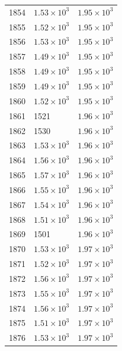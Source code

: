 \begin{table}[H]
\begin{tabular}{lll}
1854 & $\displaystyle 1.53 \times 10^{3}$ & $\displaystyle 1.95 \times 10^{3}$ \\
1855 & $\displaystyle 1.52 \times 10^{3}$ & $\displaystyle 1.95 \times 10^{3}$ \\
1856 & $\displaystyle 1.53 \times 10^{3}$ & $\displaystyle 1.95 \times 10^{3}$ \\
1857 & $\displaystyle 1.49 \times 10^{3}$ & $\displaystyle 1.95 \times 10^{3}$ \\
1858 & $\displaystyle 1.49 \times 10^{3}$ & $\displaystyle 1.95 \times 10^{3}$ \\
1859 & $\displaystyle 1.49 \times 10^{3}$ & $\displaystyle 1.95 \times 10^{3}$ \\
1860 & $\displaystyle 1.52 \times 10^{3}$ & $\displaystyle 1.95 \times 10^{3}$ \\
1861 & 1521 & $\displaystyle 1.96 \times 10^{3}$ \\
1862 & 1530 & $\displaystyle 1.96 \times 10^{3}$ \\
1863 & $\displaystyle 1.53 \times 10^{3}$ & $\displaystyle 1.96 \times 10^{3}$ \\
1864 & $\displaystyle 1.56 \times 10^{3}$ & $\displaystyle 1.96 \times 10^{3}$ \\
1865 & $\displaystyle 1.57 \times 10^{3}$ & $\displaystyle 1.96 \times 10^{3}$ \\
1866 & $\displaystyle 1.55 \times 10^{3}$ & $\displaystyle 1.96 \times 10^{3}$ \\
1867 & $\displaystyle 1.54 \times 10^{3}$ & $\displaystyle 1.96 \times 10^{3}$ \\
1868 & $\displaystyle 1.51 \times 10^{3}$ & $\displaystyle 1.96 \times 10^{3}$ \\
1869 & 1501 & $\displaystyle 1.96 \times 10^{3}$ \\
1870 & $\displaystyle 1.53 \times 10^{3}$ & $\displaystyle 1.97 \times 10^{3}$ \\
1871 & $\displaystyle 1.52 \times 10^{3}$ & $\displaystyle 1.97 \times 10^{3}$ \\
1872 & $\displaystyle 1.56 \times 10^{3}$ & $\displaystyle 1.97 \times 10^{3}$ \\
1873 & $\displaystyle 1.55 \times 10^{3}$ & $\displaystyle 1.97 \times 10^{3}$ \\
1874 & $\displaystyle 1.56 \times 10^{3}$ & $\displaystyle 1.97 \times 10^{3}$ \\
1875 & $\displaystyle 1.51 \times 10^{3}$ & $\displaystyle 1.97 \times 10^{3}$ \\
1876 & $\displaystyle 1.53 \times 10^{3}$ & $\displaystyle 1.97 \times 10^{3}$ \\

\end{tabular}
\end{table}

